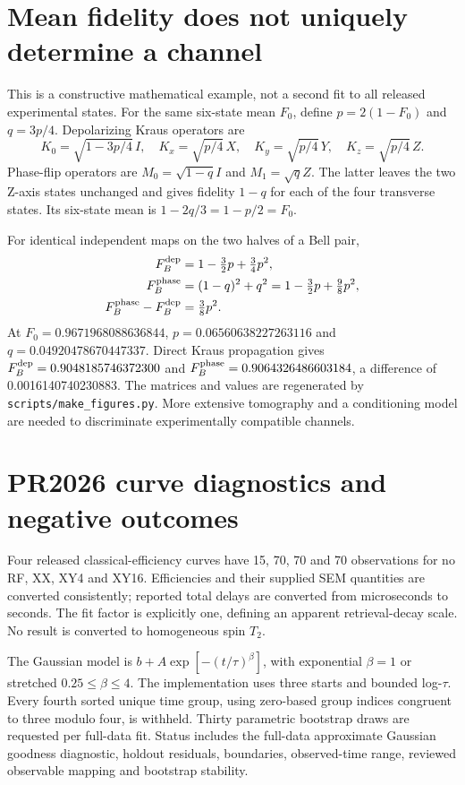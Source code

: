 \documentclass[10pt,a4paper]{article}
\newcommand{\code}[1]{\texttt{#1}}
\begin{document}
\section{Mean fidelity does not uniquely determine a channel}
This is a constructive mathematical example, not a second fit to all released experimental states. For the same six-state mean $F_0$, define $p=2(1-F_0)$ and $q=3p/4$. Depolarizing Kraus operators are
\[
K_0=\sqrt{1-3p/4}\,I,\quad
K_x=\sqrt{p/4}\,X,\quad K_y=\sqrt{p/4}\,Y,\quad K_z=\sqrt{p/4}\,Z.
\]
Phase-flip operators are $M_0=\sqrt{1-q}I$ and $M_1=\sqrt qZ$. The latter leaves the two Z-axis states unchanged and gives fidelity $1-q$ for each of the four transverse states. Its six-state mean is $1-2q/3=1-p/2=F_0$.

For identical independent maps on the two halves of a Bell pair,
\begin{align*}
F_B^{\rm dep}&=1-\tfrac32p+\tfrac34p^2,\\
F_B^{\rm phase}&=(1-q)^2+q^2=1-\tfrac32p+\tfrac98p^2,\\
F_B^{\rm phase}-F_B^{\rm dep}&=\tfrac38p^2.
\end{align*}
At $F_0=0.9671968088636844$, $p=0.06560638227263116$ and $q=0.04920478670447337$. Direct Kraus propagation gives $F_B^{\rm dep}=0.9048185746372300$ and $F_B^{\rm phase}=0.9064326486603184$, a difference of 0.0016140740230883. The matrices and values are regenerated by \code{scripts/make\_figures.py}. More extensive tomography and a conditioning model are needed to discriminate experimentally compatible channels.

\section{PR2026 curve diagnostics and negative outcomes}
Four released classical-efficiency curves have 15, 70, 70 and 70 observations for no RF, XX, XY4 and XY16. Efficiencies and their supplied SEM quantities are converted consistently; reported total delays are converted from microseconds to seconds. The fit factor is explicitly one, defining an apparent retrieval-decay scale. No result is converted to homogeneous spin $T_2$.

The Gaussian model is $b+A\exp[-(t/\tau)^\beta]$, with exponential $\beta=1$ or stretched $0.25\leq\beta\leq4$. The implementation uses three starts and bounded log-$\tau$. Every fourth sorted unique time group, using zero-based group indices congruent to three modulo four, is withheld. Thirty parametric bootstrap draws are requested per full-data fit. Status includes the full-data approximate Gaussian goodness diagnostic, holdout residuals, boundaries, observed-time range, reviewed observable mapping and bootstrap stability.


\end{document}
